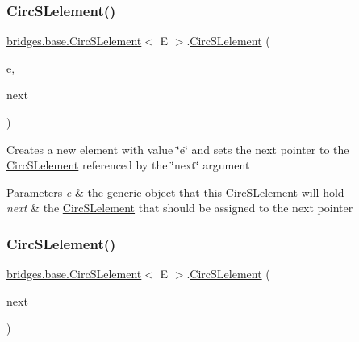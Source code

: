\subsubsection{\texorpdfstring{Circ\+S\+Lelement()}{CircSLelement()}\hspace{0.1cm}{\footnotesize\ttfamily [3/4]}}
{\footnotesize\ttfamily \hyperlink{classbridges_1_1base_1_1_circ_s_lelement}{bridges.\+base.\+Circ\+S\+Lelement}$<$ E $>$.\hyperlink{classbridges_1_1base_1_1_circ_s_lelement}{Circ\+S\+Lelement} (\begin{DoxyParamCaption}\item[{E}]{e,  }\item[{\hyperlink{classbridges_1_1base_1_1_circ_s_lelement}{Circ\+S\+Lelement}$<$ E $>$}]{next }\end{DoxyParamCaption})}

Creates a new element with value \char`\"{}e\char`\"{} and sets the next pointer to the \hyperlink{classbridges_1_1base_1_1_circ_s_lelement}{Circ\+S\+Lelement} referenced by the \char`\"{}next\char`\"{} argument


\begin{DoxyParams}{Parameters}
{\em e} & the generic object that this \hyperlink{classbridges_1_1base_1_1_circ_s_lelement}{Circ\+S\+Lelement} will hold \\
\hline
{\em next} & the \hyperlink{classbridges_1_1base_1_1_circ_s_lelement}{Circ\+S\+Lelement} that should be assigned to the next pointer \\
\hline
\end{DoxyParams}
\mbox{\label{classbridges_1_1base_1_1_circ_s_lelement_ab9e5b98e8d917760b9651a52785358b9}} 
\subsubsection{\texorpdfstring{Circ\+S\+Lelement()}{CircSLelement()}\hspace{0.1cm}{\footnotesize\ttfamily [4/4]}}
{\footnotesize\ttfamily \hyperlink{classbridges_1_1base_1_1_circ_s_lelement}{bridges.\+base.\+Circ\+S\+Lelement}$<$ E $>$.\hyperlink{classbridges_1_1base_1_1_circ_s_lelement}{Circ\+S\+Lelement} (\begin{DoxyParamCaption}\item[{\hyperlink{classbridges_1_1base_1_1_circ_s_lelement}{Circ\+S\+Lelement}$<$ E $>$}]{next }\end{DoxyParamCaption})}

